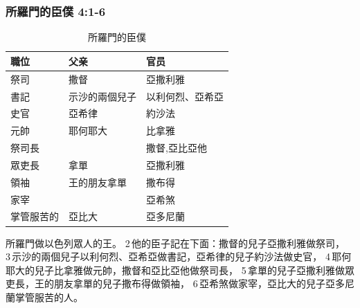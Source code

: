 \subsubsection{所羅門的臣僕 4:1-6}
\begin{table}
\vspace*{-13mm}
\centering
\begin{tabular}{p{1.85cm}|p{2.5cm}|p{2.75cm}}\hline\hline
職位   &父亲 &官员\\\hline\hline
祭司&撒督&亞撒利雅\\\hline
 書記              &示沙的兩個兒子&以利何烈、亞希亞\\\hline
  史官                     &亞希律&約沙法\\\hline
 元帥&耶何耶大&比拿雅\\\hline
 祭司長  & &撒督,亞比亞他\\\hline
眾吏長  & 拿單&亞撒利雅\\\hline
  領袖 & 王的朋友拿單&撒布得\\\hline
   家宰  &&亞希煞 \\\hline
 掌管服苦的&亞比大&亞多尼蘭 \\\hline
 \end{tabular}
\caption{所羅門的臣僕}
\end{table}
所羅門做以色列眾人的王。 2 他的臣子記在下面：撒督的兒子亞撒利雅做祭司， 3 示沙的兩個兒子以利何烈、亞希亞做書記，亞希律的兒子約沙法做史官， 4 耶何耶大的兒子比拿雅做元帥，撒督和亞比亞他做祭司長， 5 拿單的兒子亞撒利雅做眾吏長，王的朋友拿單的兒子撒布得做領袖， 6 亞希煞做家宰，亞比大的兒子亞多尼蘭掌管服苦的人。



